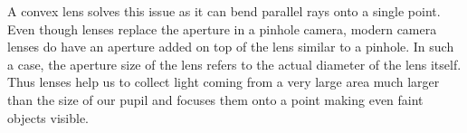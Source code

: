 \documentclass{../template/texnote}
\begin{document}
A convex lens solves this issue as it can bend parallel rays onto a single point.
Even though lenses replace the aperture in a pinhole camera, modern camera lenses do have an aperture added on top of the lens similar to a pinhole.
In such a case, the aperture size of the lens refers to the actual diameter of the lens itself.
Thus lenses help us to collect light coming from a very large area much larger than the size of our pupil and focuses them onto a point making even faint objects visible.




\end{document}
